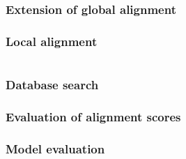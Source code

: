 \documentclass[12pt]{article}
\begin{document}
\section{Extension of global alignment}







\newpage

%
%
\setcounter{figure}{0}
\setcounter{table}{0}
\section{Local alignment}




\newpage

%
%
\part{}

%
%
\setcounter{figure}{0}
\setcounter{table}{0}
\section{Database search}







\newpage

%
%
\setcounter{figure}{0}
\setcounter{table}{0}
\section{Evaluation of alignment scores}






\newpage

%
%
\setcounter{figure}{0}
\setcounter{table}{0}
\section{Model evaluation}


\newpage


\end{document}
